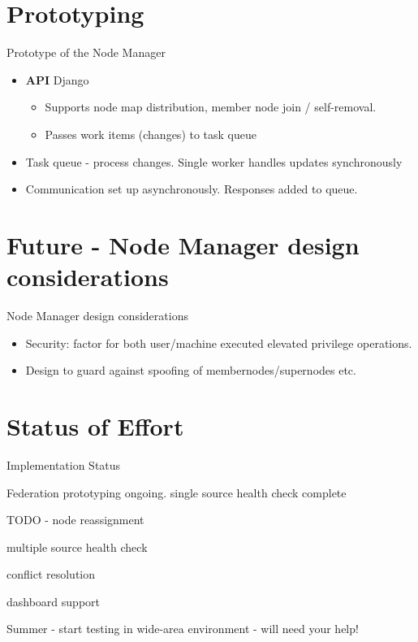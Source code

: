 \documentclass{beamer}
\begin{document}
\section{Prototyping}
\begin{frame}{Prototype of the Node Manager}
\begin{itemize}
\item
\textbf{API} Django
\begin{itemize}
 \item Supports node map distribution, member node join / self-removal.
\item
Passes work items (changes) to task queue
\end{itemize}
\item Task queue  - process changes.  Single worker handles updates synchronously

\item
Communication set up asynchronously. Responses added to queue.  

\end{itemize}

\end{frame}





\section{Future - Node Manager design considerations}
\begin{frame}{Node Manager design considerations}
\begin{itemize}
\item Security: factor for both user/machine executed elevated privilege operations.
\item Design to guard against spoofing of membernodes/supernodes etc.
\end{itemize}
\end{frame}

\section{Status of Effort}
\begin{frame}{Implementation Status}

Federation prototyping ongoing.   single source health check complete

 TODO - node reassignment

 multiple source health check

 conflict resolution

 dashboard support
 

Summer - start testing in wide-area environment - will need your help!

\end{frame}
\end{document}
